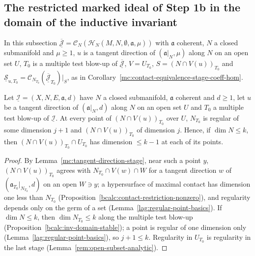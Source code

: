 \subsection{The restricted marked ideal of Step 1b in the domain of the inductive invariant}

In this subsection \(\overline{\underline{\mathcal J}}=\mathcal C_N(\mathcal H_N(M,N,\emptyset,\mathfrak a,\mu))\) with \(\mathfrak a\) coherent, \(N\) a closed submanifold and \(\mu\ge1\),
\(u\) is a tangent direction of \((\mathfrak a|_N,\mu)\) along \(N\) on an open set \(U\), \(T_0\) is a multiple test blow-up of \(\overline{\underline{\mathcal J}}\),
\(V=U_{T_0}\), \(S=(N\cap V(u))_{T_0}\) and \(\underline{\mathcal S}_{u,T_0}=\mathcal C_{N_{T_0}}(\overline{\underline{\mathcal J}}_{T_0})|_S\), as in
Corollary~\ref{mc:contact-equivalence-stage-coeff-hom}.

\begin{lemma}
\label{mc:contact-stage-dimension}
\leanok
Let \(\underline{\mathcal I}=(X,N,E,\mathfrak a,d)\) have \(N\) a closed submanifold, \(\mathfrak a\) coherent and \(d\ge1\), let \(u\) be a tangent direction of
\((\mathfrak a|_N,d)\) along \(N\) on an open set \(U\) and \(T_0\) a multiple test blow-up of \(\underline{\mathcal I}\). At every point of \((N\cap V(u))_{T_0}\) over \(U\),
\(N_{T_0}\) is regular of some dimension \(j+1\) and \((N\cap V(u))_{T_0}\) of dimension \(j\). Hence, if \(\dim N\le k\), then \((N\cap V(u))_{T_0}\cap U_{T_0}\) has dimension
\(\le k-1\) at each of its points.
\end{lemma}
\begin{proof}
\leanok
By Lemma~\ref{mc:tangent-direction-stage}, near such a point \(y\), \((N\cap V(u))_{T_0}\) agrees with \(N_{T_0}\cap V(w)\cap W\) for a tangent direction \(w\) of
\((\mathfrak a_{T_0}|_{N_{T_0}},d)\) on an open \(W\ni y\); a hypersurface of maximal contact has dimension one less than \(N_{T_0}\)
(Proposition~\ref{bcalc:contact-restriction-nonzero}), and regularity depends only on the germ of a set (Lemma~\ref{lag:regular-point-basics}). If \(\dim N\le k\), then
\(\dim N_{T_0}\le k\) along the multiple test blow-up (Proposition~\ref{bcalc:inv-domain-stable}); a point is regular of one dimension only
(Lemma~\ref{lag:regular-point-basics}), so \(j+1\le k\). Regularity in \(U_{T_0}\) is regularity in the last stage (Lemma~\ref{rem:open-subset-analytic}).
\end{proof}

